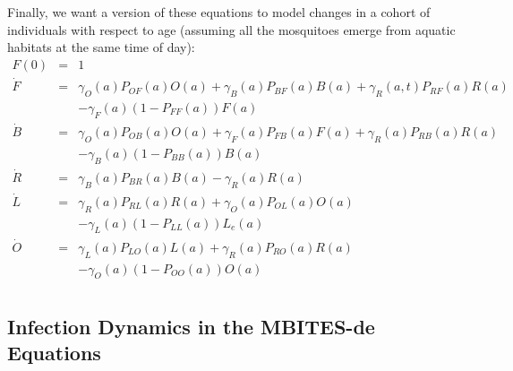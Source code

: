 \documentclass{article}
\begin{document}
Finally, we want a version of these equations to model changes in a cohort of individuals with respect to age (assuming all the mosquitoes emerge from aquatic habitats at the same time of day): 
%
\begin{equation}\begin{array}{rcl}
F(0) &=& 1 \\ 
%
{\dot F}&=& 
\gamma_O(a) P_{OF}(a) O(a) 
+ \gamma_B(a) P_{BF}(a) B(a) 
 + \gamma_R(a,t) P_{RF}(a) R(a)
\\ &&
- \gamma_F(a) (1 - P_{FF}(a)) F(a) 
 \\ 
%
%
{\dot B} &=&  \gamma_O(a) P_{OB}(a) O(a) + \gamma_F(a) P_{FB}(a) F(a) 
+ \gamma_R(a) P_{RB}(a) R(a) \\ && 
- \gamma_B(a) (1-P_{BB}(a)) B(a)
\\
%
{\dot R} &=&  \gamma_B(a) P_{BR}(a) B(a) - \gamma_R(a) R(a)\\ 
%
{\dot L}&=& \gamma_R(a) P_{RL}(a) R(a) + 
\gamma_O(a) P_{OL}(a) O(a) \\&&
- \gamma_L(a) (1 - P_{LL}(a)) L_e(a)
\\ 
%
{\dot O} &=& \gamma_L(a) P_{LO}(a) L(a) 
+ \gamma_R(a) P_{RO}(a) R(a)  
\\&& 
- \gamma_O(a) (1 - P_{OO}(a)) O(a)
\\ 
%
\end{array}\end{equation}

\subsection{Infection Dynamics in the MBITES-de Equations}
\end{document}
